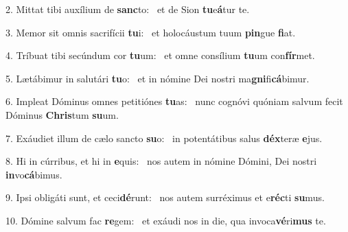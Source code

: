2. Mittat tibi auxílium de \textbf{sanc}to: \ast\  et de Sion \textbf{tu}e\textbf{á}tur te.\

3. Memor sit omnis sacrifícii \textbf{tu}i: \ast\  et holocáustum tuum \textbf{pin}gue \textbf{fi}at.\

4. Tríbuat tibi secúndum cor \textbf{tu}um: \ast\  et omne consílium \textbf{tu}um con\textbf{fír}met.\

5. Lætábimur in salutári \textbf{tu}o: \ast\  et in nómine Dei nostri ma\textbf{gni}fi\textbf{cá}bimur.\

6. Impleat Dóminus omnes petitiónes \textbf{tu}as: \ast\  nunc cognóvi quóniam salvum fecit Dóminus \textbf{Chris}tum \textbf{su}um.\

7. Exáudiet illum de cælo sancto \textbf{su}o: \ast\  in potentátibus salus \textbf{déx}teræ \textbf{e}jus.\

8. Hi in cúrribus, et hi in \textbf{e}quis: \ast\  nos autem in nómine Dómini, Dei nostri \textbf{in}vo\textbf{cá}bimus.\

9. Ipsi obligáti sunt, et ceci\textbf{dé}runt: \ast\  nos autem surréximus et e\textbf{réc}ti \textbf{su}mus.\

10. Dómine salvum fac \textbf{re}gem: \ast\  et exáudi nos in die, qua invoca\textbf{vé}ri\textbf{mus} te.\


